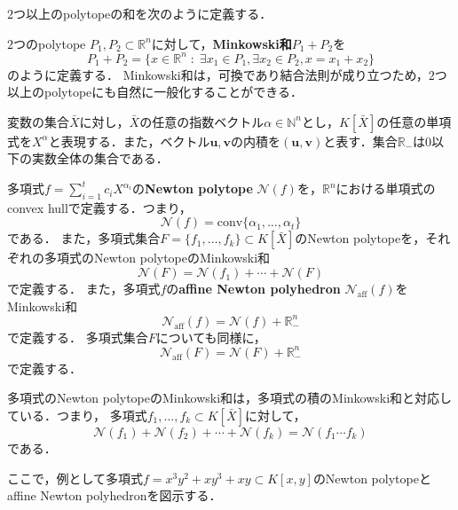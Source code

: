 $2$つ以上のpolytopeの和を次のように定義する．
\begin{definition}
	$2$つのpolytope $P_1, P_2 \subset \mathbb{R}^n$に対して，\textbf{Minkowski和}$P_1 + P_2$を
	$$P_1 + P_2 = \{ x \in \mathbb{R}^n \;:\; \exists x_1 \in P_1, \exists x_2 \in P_2, x = x_1 + x_2\}$$
	のように定義する．
	Minkowski和は，可換であり結合法則が成り立つため，$2$つ以上のpolytopeにも自然に一般化することができる．
\end{definition}
変数の集合$\bar{X}$に対し，$\bar{X}$の任意の指数ベクトル$\alpha \in \mathbb{N}^n$とし，$K[\bar{X}]$の任意の単項式を$X^\alpha$と表現する．また，ベクトル$\bm{u}, \bm{v}$の内積を$(\bm{u}, \bm{v})$と表す．集合$\mathbb{R}_{-}$は$0$以下の実数全体の集合である．
\begin{definition}
	多項式$\displaystyle f = \sum_{i=1}^t c_i X^{\alpha_i}$の\textbf{Newton polytope} $\mathcal{N}(f)$を，$\mathbb{R}^n$における単項式のconvex hullで定義する．つまり，
	$$\mathcal{N}(f) = \mathrm{conv}\{\alpha_1, \dots, \alpha_t\}$$
	である．
	また，多項式集合$F = \{f_1, \dots, f_k\} \subset K[\bar{X}]$のNewton polytopeを，それぞれの多項式のNewton polytopeのMinkowski和
	$$\mathcal{N}(F) = \mathcal{N}(f_1) + \cdots + \mathcal{N}(F)$$
	で定義する．
	また，多項式$f$の\textbf{affine Newton polyhedron} $\mathcal{N}_{\mathrm{aff}}(f)$をMinkowski和
	$$\mathcal{N}_{\mathrm{aff}}(f) = \mathcal{N}(f) + \mathbb{R}_{-}^n$$
	で定義する．
	多項式集合$F$についても同様に，$$\mathcal{N}_{\mathrm{aff}}(F) = \mathcal{N}(F) + \mathbb{R}_{-}^n$$で定義する．
\end{definition}

\begin{remark*}
	多項式のNewton polytopeのMinkowski和は，多項式の積のMinkowski和と対応している．つまり，
	多項式$f_1, \dots, f_k \subset K[\bar{X}]$に対して，
	$$\mathcal{N}(f_1) + \mathcal{N}(f_2) + \cdots + \mathcal{N}(f_k) = \mathcal{N}(f_1 \cdots f_k)$$
	である．
\end{remark*}

ここで，例として多項式$f = x^3y^2 + xy^3 + xy \subset K[x, y]$のNewton polytopeとaffine Newton polyhedronを図示する．
\\

